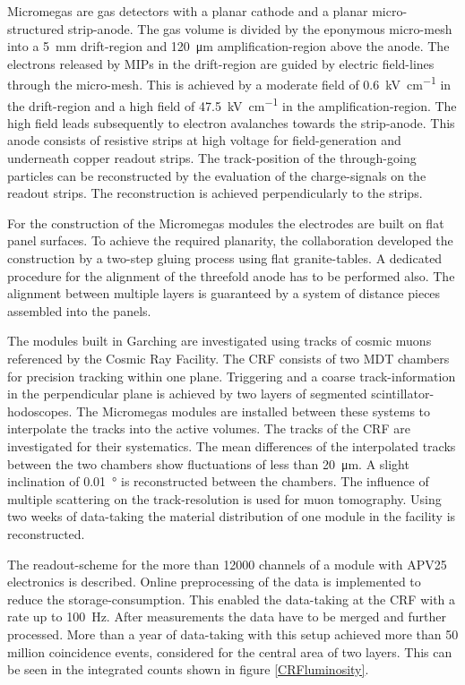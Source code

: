 \documentclass[
twoside,            %
BCOR1.4cm,          %
10pt,               %
headings=normal,    %
headsepline,        %
clearplainpage,		%
final,              %
div=14,
open=right,
bibliography=toc
]{scrreprt}
\begin{document}
Micromegas are gas detectors with a planar cathode and a planar micro-structured strip-anode.
The gas volume is divided by the eponymous micro-mesh into a \SI{5}{mm} drift-region and \SI{120}{\micro\m} amplification-region above the anode.
The electrons released by MIPs in the drift-region are guided by electric field-lines through the micro-mesh.
This is achieved by a moderate field of \SI{0.6}{\kV\per\cm} in the drift-region and a high field of \SI{47.5}{\kV\per\cm} in the amplification-region.
The high field leads subsequently to electron avalanches towards the strip-anode.
This anode consists of resistive strips at high voltage for field-generation and underneath copper readout strips.
The track-position of the through-going particles can be reconstructed by the evaluation of the charge-signals on the readout strips.
The reconstruction is achieved perpendicularly to the strips.

For the construction of the Micromegas modules the electrodes are built on flat panel surfaces.
To achieve the required planarity, the collaboration developed the construction by a two-step gluing process using flat granite-tables.
A dedicated procedure for the alignment of the threefold anode has to be performed also.
The alignment between multiple layers is guaranteed by a system of distance pieces assembled into the panels.

The modules built in Garching are investigated using tracks of cosmic muons referenced by the Cosmic Ray Facility.
The CRF consists of two MDT chambers for precision tracking within one plane.
Triggering and a coarse track-information in the perpendicular plane is achieved by two layers of segmented scintillator-hodoscopes.
The Micromegas modules are installed between these systems to interpolate the tracks into the active volumes.
The tracks of the CRF are investigated for their systematics.
The mean differences of the interpolated tracks between the two chambers show fluctuations of less than \SI{20}{\micro\m}.
A slight inclination of \SI{0.01}{\degree} is reconstructed between the chambers.
The influence of multiple scattering on the track-resolution is used for muon tomography.
Using two weeks of data-taking the material distribution of one module in the facility is reconstructed.

The readout-scheme for the more than 12000 channels of a module with APV25 electronics is described.
Online preprocessing of the data is implemented to reduce the storage-consumption.
This enabled the data-taking at the CRF with a rate up to \SI{100}{Hz}.
After measurements the data have to be merged and further processed.
More than a year of data-taking with this setup achieved more than 50 million coincidence events, considered for the central area of two layers.
This can be seen in the integrated counts shown in figure \ref{CRFluminosity}.
\end{document}

